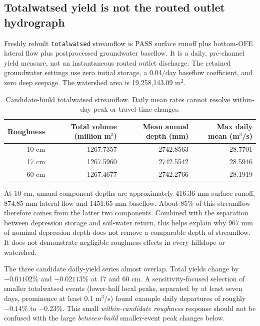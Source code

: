 \subsection{Totalwatsed yield is not the routed outlet hydrograph}

Freshly rebuilt \texttt{totalwatsed} streamflow is PASS surface runoff plus
bottom-OFE lateral flow plus postprocessed groundwater baseflow. It is a daily,
pre-channel yield measure, not an instantaneous routed outlet discharge.
The retained groundwater settings use zero initial storage, a 0.04/day
baseflow coefficient, and zero deep seepage. The watershed area is
19,258,143.09 m$^2$.

\begin{table}[H]
\centering\small
\caption{Candidate-build totalwatsed streamflow. Daily mean rates cannot
resolve within-day peak or travel-time changes.}
\begin{tabular}{rrrr}
\toprule
Roughness & Total volume (million m$^3$) & Mean annual depth (mm) & Max daily mean (m$^3$/s) \\
\midrule
10 cm & 1267.7357 & 2742.8563 & 28.7701 \\
17 cm & 1267.5960 & 2742.5542 & 28.5946 \\
60 cm & 1267.4677 & 2742.2766 & 28.1919 \\
\bottomrule
\end{tabular}
\end{table}

At 10 cm, annual component depths are approximately 416.36 mm surface runoff,
874.85 mm lateral flow and 1451.65 mm baseflow. About 85\% of this streamflow
therefore comes from the latter two components. Combined with the separation
between depression storage and soil-water return, this helps explain why
967 mm of nominal depression depth does not remove a comparable depth of
streamflow. It does not demonstrate negligible roughness effects in every
hillslope or watershed.

The three candidate daily-yield series almost overlap. Total yields change
by $-0.01102\%$ and $-0.02113\%$ at 17 and 60 cm. A sensitivity-focused
selection of smaller totalwatsed events (lower-half local peaks, separated
by at least seven days, prominence at least 0.1 m$^3$/s) found example
daily departures of roughly $-0.14\%$ to $-0.23\%$. This small
\emph{within-candidate roughness} response should not be confused with the
large \emph{between-build} smaller-event peak changes below.

